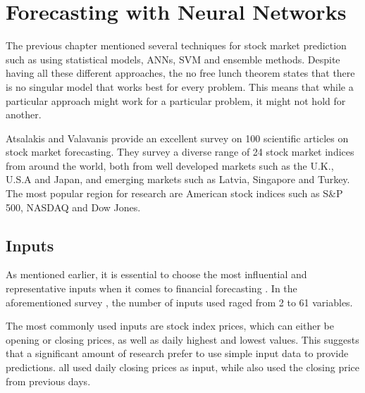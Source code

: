 \documentclass{UoYCSproject}
\begin{document}
\section{Forecasting with Neural Networks}
The previous chapter mentioned several techniques for stock market prediction such as using statistical models, ANNs, SVM and ensemble methods. Despite having all these different approaches, the no free lunch theorem \cite{wolpert1997no} states that there is no singular model that works best for every problem. This means that while a particular approach might work for a particular problem, it might not hold for another. 

Atsalakis and Valavanis \cite{atsalakis2009surveying} provide an excellent survey on 100 scientific articles on stock market forecasting. They survey a diverse range of 24 stock market indices from around the world, both from well developed markets such as the U.K., U.S.A and Japan, and emerging markets such as Latvia, Singapore and Turkey. The most popular region for research are American stock indices such as S\&P 500, NASDAQ and Dow Jones.

\subsection{Inputs}
As mentioned earlier,  it is essential to choose the most influential and representative inputs when it comes to financial forecasting \cite{zhong2017forecasting}. In the aforementioned survey \cite{atsalakis2009surveying}, the number of inputs used raged from 2 to 61 variables. 

The most commonly used inputs are stock index prices, which can either be opening or closing prices, as well as daily highest and lowest values. This suggests that a significant amount of research prefer to use simple input data to provide predictions. \cite{barnes2000study, donaldson1999neural, halliday2004equity, tan1995conservative, pai2005hybrid, pantazopoulos1998financial} all used daily closing prices as input, while \cite{andreou2000testing, fernandez2000profitability, pan2005predicting,tang2002web} also used the closing price from previous days. 
\end{document}
